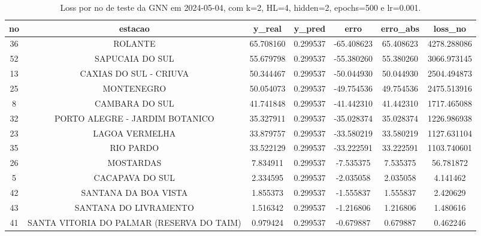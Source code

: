 \begin{table}[h]
\centering
\caption{Loss por no de teste da GNN em 2024-05-04, com k=2, HL=4, hidden=2, epochs=500 e lr=0.001.}
\label{tab:gnn_loss_k2_hl4_h2_e500_d20240504}
\begin{tabular}{ccccccc}
\toprule
no & estacao & y\_real & y\_pred & erro & erro\_abs & loss\_no \\
\midrule
36 & ROLANTE & 65.708160 & 0.299537 & -65.408623 & 65.408623 & 4278.288086 \\
52 & SAPUCAIA DO SUL & 55.679798 & 0.299537 & -55.380260 & 55.380260 & 3066.973145 \\
13 & CAXIAS DO SUL - CRIUVA & 50.344467 & 0.299537 & -50.044930 & 50.044930 & 2504.494873 \\
25 & MONTENEGRO & 50.054073 & 0.299537 & -49.754536 & 49.754536 & 2475.513916 \\
8 & CAMBARA DO SUL & 41.741848 & 0.299537 & -41.442310 & 41.442310 & 1717.465088 \\
32 & PORTO ALEGRE - JARDIM BOTANICO & 35.327911 & 0.299537 & -35.028374 & 35.028374 & 1226.986938 \\
23 & LAGOA VERMELHA & 33.879757 & 0.299537 & -33.580219 & 33.580219 & 1127.631104 \\
35 & RIO PARDO & 33.522129 & 0.299537 & -33.222591 & 33.222591 & 1103.740601 \\
26 & MOSTARDAS & 7.834911 & 0.299537 & -7.535375 & 7.535375 & 56.781872 \\
5 & CACAPAVA DO SUL & 2.334595 & 0.299537 & -2.035058 & 2.035058 & 4.141462 \\
42 & SANTANA DA BOA VISTA & 1.855373 & 0.299537 & -1.555837 & 1.555837 & 2.420629 \\
43 & SANTANA DO LIVRAMENTO & 1.516342 & 0.299537 & -1.216806 & 1.216806 & 1.480616 \\
41 & SANTA VITORIA DO PALMAR (RESERVA DO TAIM) & 0.979424 & 0.299537 & -0.679887 & 0.679887 & 0.462246 \\
\bottomrule
\end{tabular}
\end{table}
